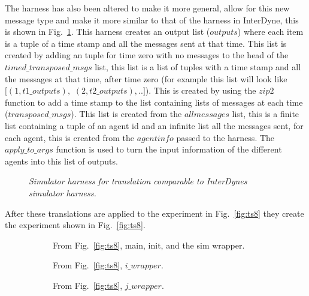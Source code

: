 \documentclass{article}
\begin{document}
The harness has also been altered to make it more general, allow for this new message type and make it more similar to that of the harness in InterDyne, this is shown in Fig.~\ref{fig:harn8}. This harness creates an output list ($outputs$) where each item is a tuple of a time stamp and all the messages sent at that time. This list is created by adding an tuple for time zero with no messages to the head of the $timed\_transposed\_msgs$ list, this list is a list of tuples with a time stamp and all the messages at that time, after time zero (for example this list will look like $[(1, t1\_outputs),$ $(2, t2\_outputs), ..]$). This is created by using the $zip2$ function to add a time stamp to the list containing lists of messages at each time ($transposed\_msgs$). This list is created from the $allmessages$ list, this is a finite list containing a tuple of an agent id and an infinite list all the messages sent, for each agent, this is created from the $agentinfo$ passed to the harness. The $apply\_to\_args$ function is used to turn the input information of the different agents into this list of outputs.
\begin{figure}[H]
	\centering
	
	\caption{\it Simulator harness for translation comparable to InterDynes simulator harness.}
	\label{fig:harn8}
\end{figure} 

After these translations are applied to the experiment in Fig.~\ref{fig:ts8} they create the experiment shown in Fig.~\ref{fig:ts8}.
\begin{figure}[H]
	\centering
	\begin{subfigure}[b]{1\textwidth}
	
	\caption{From Fig.~\ref{fig:ts8}, main, init, and the sim wrapper.}
        \label{fig:ts81}
	\end{subfigure}
	\caption*{}
\end{figure}
	
\begin{figure}[H]\ContinuedFloat
	\centering
	\begin{subfigure}[b]{1\textwidth}
	
	\caption{From Fig.~\ref{fig:ts8}, $i\_wrapper$.}
        \label{fig:ts82}
	\end{subfigure}
	\caption*{}
\end{figure}

\begin{figure}[H]\ContinuedFloat
	\centering
	\begin{subfigure}[b]{1\textwidth}
	
	\caption{From Fig.~\ref{fig:ts8}, $j\_wrapper$.}
        \label{fig:ts83}
	\end{subfigure}
	\caption*{}
\end{figure}
	
\end{document}
